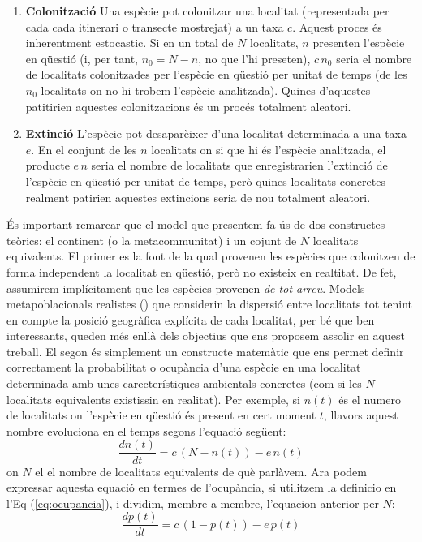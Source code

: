 \documentclass{article}
\begin{document}
\begin{enumerate}
\item \textbf{Colonitzaci\'o} Una esp\`ecie pot colonitzar una localitat (representada per cada cada itinerari o transecte mostrejat) a un taxa $c$. Aquest proces \'es inherentment estocastic. Si en un total de $N$ localitats, $n$ presenten l'esp\`ecie en q\"uesti\'o (i, per tant, $n_0 = N-n$, no que l'hi preseten), $c\, n_0$ seria el nombre de localitats colonitzades per l'esp\`ecie en q\"uesti\'o per unitat de temps (de les $n_0$ localitats on no hi trobem l'esp\`ecie analitzada). Quines d'aquestes patitirien aquestes colonitzacions \'es un proc\'es totalment aleatori. 

\item \textbf{Extinci\'o} L'esp\`ecie pot desapar\`eixer d'una localitat determinada a una taxa $e$. En el conjunt de les $n$ localitats on si que hi \'es l'esp\`ecie analitzada, el producte $e\,n$ seria el nombre de localitats que enregistrarien l'extinci\'o de l'esp\`ecie en q\"uesti\'o per unitat de temps, per\`o quines localitats concretes realment patirien aquestes extincions seria de nou totalment aleatori.
\end{enumerate}
\smallskip

\'Es important remarcar que el model que presentem fa \'us de dos constructes te\`orics: el continent (o la metacommunitat) i un cojunt de $N$ localitats equivalents. El primer es la font de la qual provenen les esp\`ecies  que colonitzen de forma independent la localitat en q\"uesti\'o, per\`o no existeix en realtitat. De fet, assumirem impl\'icitament que les esp\`ecies provenen {\it de tot arreu}. Models metapoblacionals realistes (\cite{hanski1991single,hanski2004ecology}) que considerin la dispersi\'o entre localitats tot tenint en compte la posici\'o geogr\`afica expl\'icita de cada localitat, per b\'e que ben interessants, queden m\'es enll\`a dels objectius que ens proposem assolir en aquest treball. El segon \'es simplement un constructe matem\`atic que ens permet definir correctament la probabilitat o ocup\`ancia d'una esp\`ecie en una localitat determinada amb unes carecter\'istiques ambientals concretes (com si les $N$ localitats equivalents existissin en realitat). Per exemple, si $n(t)$ \'es el numero de localitats on l'esp\`ecie en q\"uesti\'o \'es present en cert moment $t$, llavors aquest nombre evoluciona en el temps segons l'equaci\'o seg\"uent: 
\begin{equation}
    \frac{dn(t)}{dt} = c\,(N-n(t)) - e\,n(t)
\end{equation}
on $N$ el el nombre de localitats equivalents de qu\`e parl\`avem. Ara podem expressar aquesta equaci\'o en termes de l'ocup\`ancia, si utilitzem la definicio en l'Eq (\ref{eq:ocupancia}), i dividim, membre a membre, l'equacion anterior per $N$:
\begin{equation}
    \frac{dp(t)}{dt} = c\,(1-p(t)) - e\,p(t)
    \label{eq:fonamental}
\end{equation}
\end{document}
